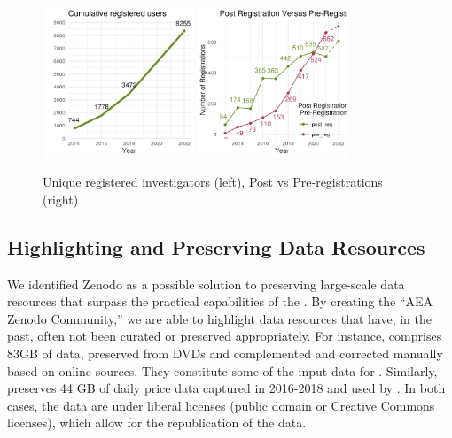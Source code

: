 \begin{figure}
\centering
\includegraphics[width=0.4\textwidth]{data/registry/AEA_registryanalysis-main/Output/registered_users.png}
\includegraphics[width=0.4\textwidth]{data/registry/AEA_registryanalysis-main/Output/post_pre_reg.png}
\caption{Unique registered investigators (left), Post vs Pre-registrations (right)}
    \label{fig:registry2}
\end{figure}

\subsection{Highlighting and Preserving Data Resources}

We identified Zenodo as a possible solution to preserving large-scale data resources that surpass the practical capabilities of the \aeadcr{}. By creating the ``AEA Zenodo Community,'' we are able to highlight data resources that have, in the past, often not been curated or preserved appropriately. For instance, \citet{u_s_geological_survey_2022_5830968} comprises 83GB of data, preserved from DVDs and complemented and corrected manually based on online sources. They constitute some of the input data for \citet{10.1257/app.20200398}. Similarly, \citet{ministerio_de_desarrollo_productivo_arge_2022_6568295} preserves 44 GB of daily price data  captured in 2016-2018 and used by \citet{10.1257/mac.20210172}. In both cases, the data are under liberal licenses (public domain or Creative Commons licenses), which allow for the republication of the data. 



